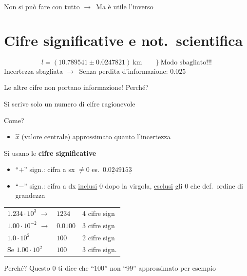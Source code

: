 \documentclass[11pt,a4paper,oneside]{book}
\newcommand{\grigio}[1]{{\color{grigio}#1}}
\newcommand{\fr}{\ensuremath{\rightarrow}}
\newcommand{\chiave}[1]{\textbf{#1}}
\begin{document}
\begin{spunto}
Non si può fare con tutto \fr\ Ma è utile l'inverso
\end{spunto}

\section{Cifre significative e not.\ scientifica}

\[
  l = (10.789541 \pm 0.0247821)\ \mathrm{km} \qquad \bigr\}\ \text{Modo sbagliato!!!}
\]
Incertezza sbagliata \fr\ Senza perdita d'informazione: $0.025$

\grigio{Le altre cifre non portano informazione!} Perché?

\begin{attenzione}
Si scrive solo un numero di cifre ragionevole
\end{attenzione}

Come?
\begin{itemize}[label=--]
  \item $\hat{x}$ \grigio{(valore centrale)} approssimato quanto l'incertezza
\end{itemize}

Si usano le \chiave{cifre significative}
\begin{itemize}[label=--]
  \item ``$+$'' sign.: cifra a sx $\neq 0$ \qquad es.\ $0.0\underline{2}4915\underline{3}$
  \item ``$-$'' sign.: cifra a dx \underline{inclusi} $0$ dopo la virgola, \underline{esclusi} gli $0$ che def.\ ordine di grandezza
\end{itemize}

\begin{center}
\begin{tabular}{@{}lll@{}}
  $1.234 \cdot 10^{3}$ \fr & $1234$ & 4 cifre sign \\
  $1.00 \cdot 10^{-2}$ \fr & $0.0100$ & 3 cifre sign \\
  $1.0 \cdot 10^{2}$ & $100$ & 2 cifre sign \\
  Se $1.00 \cdot 10^{2}$ & $100$ & 3 cifre sign. \\
\end{tabular}
\end{center}

\begin{spunto}
Perché? Questo $0$ ti dice che ``100'' non ``99'' approssimato per esempio
\end{spunto}
\end{document}
